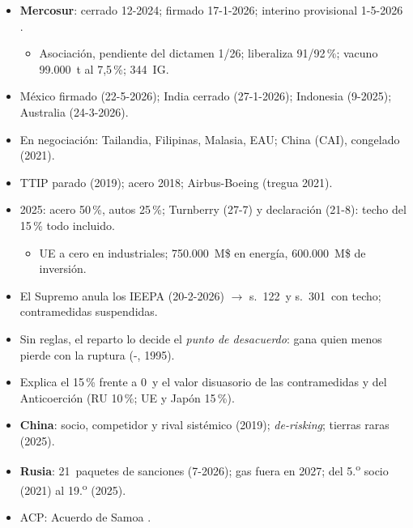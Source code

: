 \documentclass{article}
\begin{document}
\begin{columnas}
\begin{itemize}
\item \textbf{Mercosur}: cerrado 12-2024; firmado 17-1-2026; interino provisional 1-5-2026 .
  \begin{itemize}
  \item Asociación, pendiente del dictamen 1/26; liberaliza 91/92\,\%; vacuno 99.000~t al 7,5\,\%; 344~IG.
  \end{itemize}
\item México firmado (22-5-2026); India cerrado (27-1-2026); Indonesia (9-2025); Australia (24-3-2026).
\item En negociación: Tailandia, Filipinas, Malasia, EAU; China (CAI), congelado (2021).
\end{itemize}

\begin{itemize}
\item TTIP parado (2019); acero 2018; Airbus-Boeing (tregua 2021).
\item 2025: acero 50\,\%, autos 25\,\%; Turnberry (27-7) y declaración (21-8): techo del 15\,\% todo incluido.
  \begin{itemize}
  \item UE a cero en industriales; 750.000~M\$ en energía, 600.000~M\$ de inversión.
  \end{itemize}
\item El Supremo anula los IEEPA (20-2-2026) $\to$ s.~122~y s.~301~con techo; contramedidas suspendidas.
\end{itemize}
\begin{itemize}
\item Sin reglas, el reparto lo decide el \emph{punto de desacuerdo}: gana quien menos pierde con la ruptura (-, 1995).
\item Explica el 15\,\% frente a 0~y el valor disuasorio de las contramedidas y del Anticoerción (RU 10\,\%; UE y Japón 15\,\%).
\end{itemize}
\begin{itemize}
\item \textbf{China}: socio, competidor y rival sistémico (2019); \emph{de-risking}; tierras raras (2025).
\item \textbf{Rusia}: 21~paquetes de sanciones (7-2026); gas fuera en 2027; del 5.\textsuperscript{o} socio (2021) al 19.\textsuperscript{o} (2025).
\item ACP: Acuerdo de Samoa .
\end{itemize}


\end{columnas}
\end{document}
